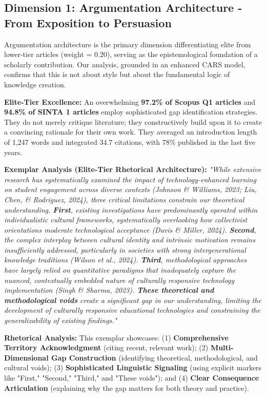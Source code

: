 \documentclass[journal,article,submit,pdftex,moreauthors]{Definitions/mdpi}
\begin{document}
\subsection{Dimension 1: Argumentation Architecture - From Exposition to Persuasion}

Argumentation architecture is the primary dimension differentiating elite from lower-tier articles (weight = 0.20), serving as the epistemological foundation of a scholarly contribution. Our analysis, grounded in an enhanced CARS model, confirms that this is not about style but about the fundamental logic of knowledge creation.

\textbf{Elite-Tier Excellence:} An overwhelming \textbf{97.2\% of Scopus Q1 articles} and \textbf{94.8\% of SINTA 1 articles} employ sophisticated gap identification strategies. They do not merely critique literature; they constructively build upon it to create a convincing rationale for their own work. They averaged an introduction length of 1,247 words and integrated 34.7 citations, with 78\% published in the last five years.

\textbf{Exemplar Analysis (Elite-Tier Rhetorical Architecture):}
\textit{"While extensive research has systematically examined the impact of technology-enhanced learning on student engagement across diverse contexts (Johnson \& Williams, 2023; Liu, Chen, \& Rodriguez, 2024), three critical limitations constrain our theoretical understanding. \textbf{First}, existing investigations have predominantly operated within individualistic cultural frameworks, systematically overlooking how collectivist orientations moderate technological acceptance (Davis \& Miller, 2024). \textbf{Second}, the complex interplay between cultural identity and intrinsic motivation remains insufficiently addressed, particularly in societies with strong intergenerational knowledge traditions (Wilson et al., 2024). \textbf{Third}, methodological approaches have largely relied on quantitative paradigms that inadequately capture the nuanced, contextually embedded nature of culturally responsive technology implementation (Singh \& Sharma, 2023). \textbf{These theoretical and methodological voids} create a significant gap in our understanding, limiting the development of culturally responsive educational technologies and constraining the generalizability of existing findings."}

\textbf{Rhetorical Analysis:} This exemplar showcases: (1) \textbf{Comprehensive Territory Acknowledgment} (citing recent, relevant work); (2) \textbf{Multi-Dimensional Gap Construction} (identifying theoretical, methodological, and cultural voids); (3) \textbf{Sophisticated Linguistic Signaling} (using explicit markers like "First," "Second," "Third," and "These voids"); and (4) \textbf{Clear Consequence Articulation} (explaining why the gap matters for both theory and practice).
\end{document}
